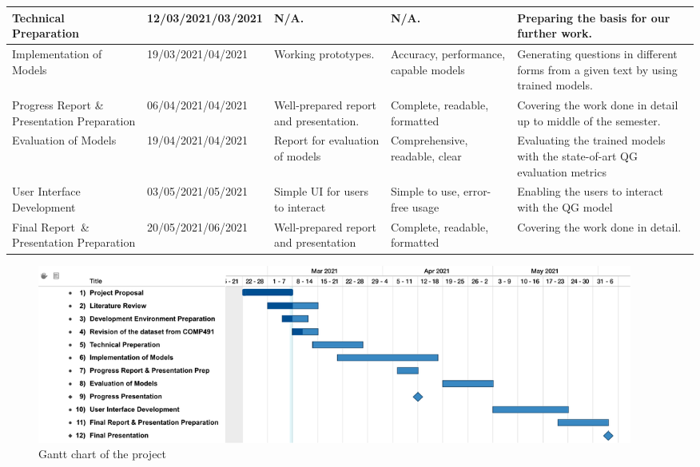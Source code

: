 \documentclass[10pt]{article}
\begin{document}
\begin{center}
\begin{table}[H]
\begin{tabularx}{\textwidth}{|>{\raggedright\arraybackslash}m{28mm}|m{20mm}|m{28mm}|m{28mm}|m{39mm}|}
				Technical Preparation & 12/03/2021\newline 25/03/2021 & N/A. & N/A. & Preparing the basis for our further work. \\ \hline
				
				Implementation of Models & 19/03/2021\newline 15/04/2021 & Working prototypes. & Accuracy, performance, capable models & Generating questions in different forms from a given text by using trained models. \\ \hline
				
				Progress Report \& Presentation Preparation & 06/04/2021\newline 09/04/2021 & Well-prepared report and presentation. & Complete, readable, formatted & Covering the work done in detail up to middle of the semester. \\ \hline
				
				Evaluation of Models & 19/04/2021\newline 30/04/2021 & Report for evaluation of models  & Comprehensive, readable, clear & Evaluating the trained models with the state-of-art QG evaluation metrics \\ \hline
				
				User Interface Development & 03/05/2021\newline 21/05/2021 & Simple UI for users to interact & Simple to use, error-free usage & Enabling the users to interact with the QG model  \\ \hline
				
				Final Report \& Presentation Preparation & 20/05/2021\newline 02/06/2021 & Well-prepared report and presentation & Complete, readable, formatted & Covering the work done in detail. \\ \hline
			\end{tabularx}
		\end{table}
	\end{center}
	\begin{figure}[H]
		\centering
		\includegraphics[width=0.95\textwidth]{../assets/gantt/gantt-chart.pdf}
		\caption{Gantt chart of the project}
	\end{figure}
\end{document}
